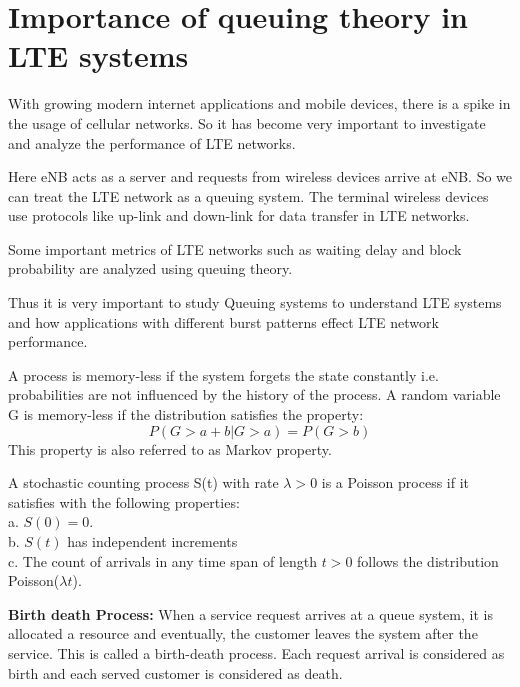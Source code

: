 \section{Importance of queuing theory in LTE systems}

With growing modern internet applications and mobile devices, there is a spike in the usage of cellular networks. So it has become very important to investigate and analyze the performance of LTE networks.

Here eNB acts as a server and requests from wireless devices arrive at eNB.
So we can treat the LTE network as a queuing system. The terminal wireless devices use protocols like up-link and down-link for data transfer in LTE networks.

Some important metrics of LTE networks such as waiting delay and block probability are analyzed using queuing theory.

Thus it is very important to study Queuing systems to understand LTE systems and how applications with different burst patterns effect LTE network performance.

\begin{definition}\label{memoryless property}
A process is memory-less if the system forgets the state constantly i.e. probabilities are not influenced by the history of the process. A random variable G is memory-less if the distribution satisfies the property:
\[
P(G>a+b | G>a) = P(G>b)
\]
This property is also referred to as Markov property.
\end{definition}
\begin{definition}\label{poisson process}
A stochastic counting process S(t) with rate $\lambda>0$ is a Poisson process if it satisfies with the following properties:
 \\a. $S(0) = 0.$
 \\b. $S(t)$ has independent increments
 \\c. The count of arrivals in any time span of length $t>0$ follows the distribution Poisson($\lambda t$).
\end{definition}

\begin{definition}
\textbf{Birth death Process:}
When a service request arrives at a queue system, it is allocated a resource and eventually, the customer leaves the system after the service. This is called a birth-death process. Each request arrival is considered as birth and each served customer is considered as death.
\end{definition}

